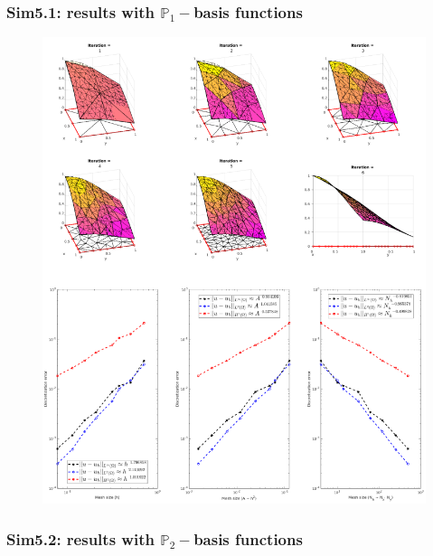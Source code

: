 \documentclass[12pt,openany,twoside,a4paper]{article}
\begin{document}
\subsubsection{Sim5.1: results with $\mathbb{P}_1-$basis functions}

\begin{figure}[H]
    \centering
    \includegraphics[keepaspectratio,height=0.675\textheight]{sim5.1.png}
    \label{sim5.1}
\end{figure}

\newpage
\subsubsection{Sim5.2: results with $\mathbb{P}_2-$basis functions}
\end{document}
